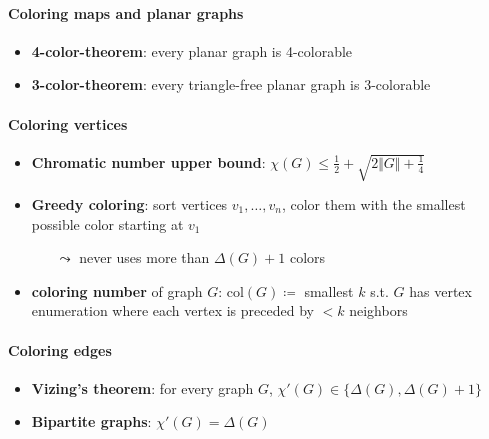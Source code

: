 \paragraph{Coloring maps and planar graphs}
\begin{itemize}
  \item \textbf{4-color-theorem}: every planar graph is 4-colorable
  \item \textbf{3-color-theorem}: every triangle-free planar graph is 3-colorable
\end{itemize}

\paragraph{Coloring vertices}
\begin{itemize}
  \item \textbf{Chromatic number upper bound}: $ \chi(G) \leq \frac{1}{2} + \sqrt{2\Vert G \Vert + \frac{1}{4}} $ 
  \item \textbf{Greedy coloring}: sort vertices $ v_1, \dots, v_n $, color them with the smallest possible color starting at $ v_1 $
  \begin{itemize}
    \item[$ \leadsto $] never uses more than $ \Delta(G) + 1 $ colors 
  \end{itemize}
  \item \textbf{coloring number} of graph $ G $: $ \text{col}(G) \coloneqq $ smallest $ k $ s.t. $ G $ has vertex enumeration where each vertex is preceded by $ < k $ neighbors
\end{itemize}

\paragraph{Coloring edges}
\begin{itemize}
  \item \textbf{Vizing's theorem}: for every graph $ G $, $ \chi'(G) \in \{ \Delta(G), \Delta(G) + 1 \} $
  \item \textbf{Bipartite graphs}: $ \chi'(G) = \Delta(G) $
\end{itemize}

